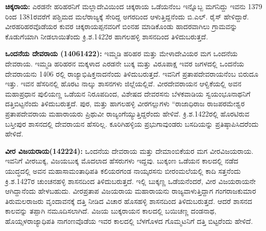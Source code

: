 \textbf{ ಚಿಕ್ಕರಾಯ:} ಎರಡನೇ ಹರಿಹರನಿಗೆ ಮಲ್ಲಾದೇವಿಯಿಂದ ಚಿಕ್ಕರಾಯ ಒಡೆಯನೆಂಬ ಇನ್ನೊಬ್ಬ ಮಗನಿದ್ದು ಇವನು 1379 ರಿಂದ 1381ರವರೆಗೆ ಪಶ್ಚಿಮದ ಮಲೆರಾಜ್ಯಕ್ಕೆ ಸೇರಿದ್ದ ಅಗರದಿಂದ ಆಳುತ್ತಿದ್ದನೆಂದು ಬಿ.ಎಲ್​. ರೈಸ್​ ಹೇಳಿದ್ದಾರೆ. ವೀರಹರಿಹರವೊಡೆಯರ ಕುವರ ಚಿಕ್ಕರಾಯಪ್ಪನವರಿಗೆ ಬಿಂನಹ ಮಾಡಿಕೊಂಡು ಹಾದರವಾಗಿಲು ಗ್ರಾಮವನ್ನು ಕೊಡುಗೆಯಾಗಿ ನೀಡಲಾಯಿತೆಂದು ಕ್ರಿ.ಶ.1422ರ ಹಾಗಲಹಳ್ಳಿ ಶಾಸನದಿಂದ ತಿಳಿದುಬರುತ್ತದೆ.

\textbf{ಒಂದನೆಯ ದೇವರಾಯ (14061422): } ಇಮ್ಮಡಿ ಹರಿಹರ ಮತ್ತು ಮೇಳಾದೇವಿಯರ ಮಗ ಒಂದನೆಯ ದೇವರಾಯ. ಇಮ್ಮಡಿ ಹರಿಹರನ ಮಕ್ಕಳಾದ ಎರಡನೇ ಬುಕ್ಕ ಮತ್ತು ವಿರೂಪಾಕ್ಷ ಇವರ ಜಗಳದಲ್ಲಿ ಒಂದನೆಯ ದೇವರಾಯನು 1406 ರಲ್ಲಿ ರಾಜ್ಯಾಭಿಷಿಕ್ತನಾದನೆಂದು ತಿಳಿದುಬರುತ್ತದೆ. ಇವನಿಗೆ ಪ್ರತಾಪದೇವರಾಯನೆಂಬ ಬಿರುದೂ ಇತ್ತು. ಇವನ ಹೆಸರಿನಲ್ಲಿ ಹೊರಟ ನಾಲ್ಕು ಶಾಸನಗಳು ಜಿಲ್ಲೆಯಲ್ಲಿವೆ. ವೀರದೇವರಾಯನ ಆಳ್ವಿಕೆಯಲ್ಲಿ ಅವನ ಮಹಾಪ್ರಧಾನ ಪುಲಿಯಣ್ಣ ಒಡೆಯನ ನಿರೂಪದಿಂದ, ವಿಶೇಷದ ದೇವರಸನು ಬೆಳಕವಾಡಿಯ ಸ್ವಯಂಭೂನಾಥನಿಗೆ ದತ್ತಿಬಿಟ್ಟನೆಂದು ತಿಳಿದುಬರುತ್ತದೆ. ಪುರ, ಮತ್ತು ಹಾಗಲಹಳ್ಳಿ ವೀರಗಲ್ಲುಗಳು “ರಾಜಾಧಿರಾಜ ರಾಜಪರಮೇಶ್ವರ ಪ್ರತಾಪದೇವರಾಯ ಮಹಾರಾಯರು ಪ್ರಿಥುವೀ ರಾಜ್ಯಂಗೆಯ್ಯುತ್ತಿದ್ದರೆಂದು ಹೇಳಿವೆ. ಕ್ರಿ.ಶ.1422ರಲ್ಲಿ ಹೊರಟಿರುವ ಬಸ್ತೀಪುರ ಶಾಸನದಲ್ಲಿ ದೇವರಾಯನ ಹೆಸರಿಲ್ಲ. ಕೂರಿಗಿಹಳ್ಳಿಯ ಪ್ರಭುಗಾವುಂಡರು ಬಸದಿಯನ್ನು ಪ್ರತಿಷ್ಠಾಪಿಸಿದರೆಂದು ಹೇಳಿದೆ.

\textbf{ವೀರ ವಿಜಯರಾಯ(142224):} ಒಂದನೆಯ ದೇವರಾಯ ಮತ್ತು ದೇಮಾಂಬಿಕೆಯರ ಮಗ ವೀರವಿಜಯರಾಯ. ಇವನಿಗೆ ವೀರಬುಕ್ಕ, ವಿಜಯಬುಕ್ಕ ಮೊದಲಾದ ಹೆಸರುಗಳು ಇದ್ದವು. ಬುಕ್ಕಂಣ ಒಡೆಯನ ಕಾಲದಲ್ಲಿ ನಡೆದ ಯುದ್ಧದಲ್ಲಿ ಅವನ ಮಹಾಸಾಮಂತಾಧಿಪತಿ ಕಲಿಯರಗಂಡ ನಾಯ್ಕರಸನು ಬೀರಂಮಲೆಯಲ್ಲಿ ಕಾದಿ ಸತ್ತನೆಂದು ಕ್ರಿ.ಶ.1427ರ ಚುಂಚನಹಳ್ಳಿ ಶಾಸನದಿಂದ ತಿಳಿದುಬರುತ್ತದೆ. ಇಲ್ಲಿ ಬುಕ್ಕಣ್ಣ ಒಡೆಯನೆಂದರೆ, ವೀರ ವಿಜಯರಾಯನೇ ಆಗಿದ್ದಾನೆಂದು ಹೇಳಬಹುದು. ವೀರಪ್ರತಾಪ ವಿಜಯರಾಯ ಮಹಾರಾಯನು ರಾಜ್ಯವಾಳುತ್ತಿದ್ದಾಗ ಗಂಗರಾಜಕುಮಾರ ತಿರುಮಲರಾಜರು ವೃಂದಾವನಕ್ಕೆ ದತ್ತಿ ನೀಡಿದ ವಿಚಾರ ಹೊಸಹಳ್ಳಿ ಶಾಸನದಿಂದ ತಿಳಿದುಬರುತ್ತದೆ. ಆದರೆ ಶಾಸನದ ಕಾಲವನ್ನು ತಪ್ಪಾಗಿ ನಮೂದಿಸಲಾಗಿದೆ. ವಿಜಯ ಬುಕ್ಕರಾಯನ ಕಾಲದಲ್ಲಿ ಬಯಿಚಣ್ಣ ದಂಡನಾಥ, ಹೊಯ್ಸಳರಾಜ್ಯಾಧಿಪತಿ ನಾಗಂಣವೊಡೆಯ ಇವರ ಕಾಲದಲ್ಲಿ ಬೆಳಗೊಳದ ಗೊಮ್ಮಟನಿಗೆ ದತ್ತಿ ಬಿಟ್ಟರೆಂದು ಹೇಳಿದೆ.

